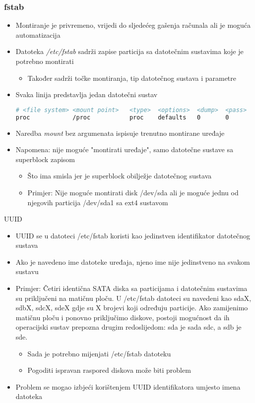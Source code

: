 \documentclass[croatian,t]{beamer} %
\begin{document}
	\begin{frame}[fragile]
	\frametitle{fstab}
		\begin{itemize}
			\item Montiranje je privremeno, vrijedi do sljedećeg gašenja računala ali je moguća automatizacija
			\item Datoteka \textit{/etc/fstab} sadrži zapise particija sa datotečnim sustavima koje je potrebno montirati
			\begin{itemize}
				\item Također sadrži točke montiranja, tip datotečnog sustava i parametre
			\end{itemize}
			\item Svaka linija predstavlja jedan datotečni sustav
			\begin{lstlisting}[basicstyle={\scriptsize\ttfamily},language=bash]
# <file system> <mount point>   <type>  <options>  <dump>  <pass>
proc            /proc           proc    defaults   0       0
			\end{lstlisting}
			\item Naredba \textit{mount} bez argumenata ispisuje trenutno montirane uređaje
			\item Napomena: nije moguće "montirati uređaje", samo datotečne sustave sa superblock zapisom
			\begin{itemize}
				\item Što ima smisla jer je superblock obilježje datotečnog sustava
				\item Primjer: Nije moguće montirati disk /dev/sda ali je moguće jednu od njegovih particija /dev/sda1 sa ext4 sustavom
			\end{itemize}
		\end{itemize}
	\end{frame}
	
	\begin{frame}{UUID}
		\begin{itemize}
			\item UUID se u datoteci /etc/fstab koristi kao jedinstven identifikator datotečnog sustava
			\item Ako je navedeno ime datoteke uređaja, njeno ime nije jedinstveno na svakom sustavu
			\item Primjer: Četiri identična SATA diska sa particijama i datotečnim sustavima su priključeni na matičnu ploču. U /etc/fstab datoteci su navedeni kao sdaX, sdbX, sdcX, sdeX gdje su X brojevi koji određuju particije. Ako zamijenimo matičnu ploču i ponovno priključimo diskove, postoji mogućnost da ih operacijski sustav prepozna drugim redoslijedom: sda je sada sdc, a sdb je sde.
			\begin{itemize}
				\item Sada je potrebno mijenjati /etc/fstab datoteku
				\item Pogoditi ispravan raspored diskova može biti problem
			\end{itemize} 
			\item Problem se mogao izbjeći korištenjem UUID identifikatora umjesto imena datoteka
		\end{itemize}
	\end{frame}
\end{document}
